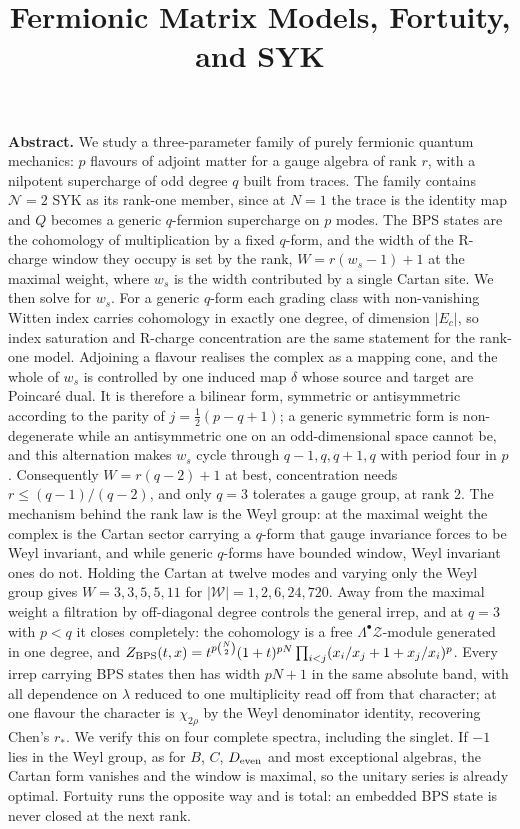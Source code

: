 \documentclass[10pt]{article}
\title{\vspace{-1.5cm}\Large\textbf{Fermionic Matrix Models, Fortuity, and SYK}\vspace{-6pt}}
\author{}
\date{}
\newcommand{\Wg}{\mathcal{W}}
\begin{document}
\maketitle
\vspace{-1.0cm}
\begin{center}\begin{minipage}{0.95\textwidth}\small
\textbf{Abstract.} We study a three-parameter family of purely fermionic quantum mechanics: $p$ flavours of
adjoint matter for a gauge algebra of rank $r$, with a nilpotent supercharge of odd degree $q$ built from traces.
The family contains $\mathcal N=2$ SYK as its rank-one member, since at $N=1$ the trace is the identity map and
$Q$ becomes a generic $q$-fermion supercharge on $p$ modes. The BPS states are the cohomology of multiplication
by a fixed $q$-form, and the width of the R-charge window they occupy is set by the rank, $W=r(w_s-1)+1$ at the
maximal weight, where $w_s$ is the width contributed by a single Cartan site. We then solve for $w_s$. For a
generic $q$-form each grading class with non-vanishing Witten index carries cohomology in exactly one degree, of
dimension $|E_c|$, so index saturation and R-charge concentration are the same statement for the rank-one model.
Adjoining a flavour realises the complex as a mapping cone, and the whole of $w_s$ is controlled by one induced
map $\delta$ whose source and target are Poincar\'e dual. It is therefore a bilinear form, symmetric or
antisymmetric according to the parity of $j=\frac12(p-q+1)$; a generic symmetric form is non-degenerate while an
antisymmetric one on an odd-dimensional space cannot be, and this alternation makes $w_s$ cycle through
$q-1,q,q+1,q$ with period four in $p$. Consequently $W=r(q-2)+1$ at best, concentration needs
$r\le(q-1)/(q-2)$, and only $q=3$ tolerates a gauge group, at rank $2$. The mechanism behind the rank law is the
Weyl group: at the maximal weight the complex is the Cartan sector carrying a $q$-form that gauge invariance
forces to be Weyl invariant, and while generic $q$-forms have bounded window, Weyl invariant ones do not.
Holding the Cartan at twelve modes and varying only the Weyl group gives $W=3,3,5,5,11$ for
$|\Wg|=1,2,6,24,720$. Away from the maximal weight a filtration by off-diagonal degree controls the general
irrep, and at $q=3$ with $p<q$ it closes completely: the cohomology is a free $\Lambda^\bullet\mathcal Z$-module
generated in one degree, and
$Z_{\rm BPS}(t,x)=t^{p\binom N2}(1+t)^{pN}\prod_{i<j}(x_i/x_j+1+x_j/x_i)^p$. Every irrep carrying BPS states
then has width $pN+1$ in the same absolute band, with all dependence on $\lambda$ reduced to one multiplicity
read off from that character; at one flavour the character is $\chi_{2\rho}$ by the Weyl denominator identity,
recovering Chen's $r_*$. We verify this on four complete spectra, including the singlet. If $-1$ lies in the Weyl group, as for $B$, $C$, $D_{\rm even}$ and most exceptional
algebras, the Cartan form vanishes and the window is maximal, so the unitary series is already optimal. Fortuity
runs the opposite way and is total: an embedded BPS state is never closed at the next rank.
\end{minipage}\end{center}
\vspace{8pt}
\end{document}

